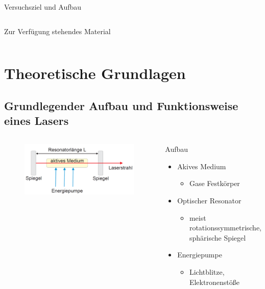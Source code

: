 \documentclass[10pt, aspectratio=169]{beamer}
\begin{document}
\begin{frame}{Versuchsziel und Aufbau}
\begin{columns}
{\begin{block}{Zur Verf\"ugung stehendes Material}
\begin{description}
{          }
        \end{description}
      \end{block}
    }
  \end{columns}
\end{frame}


\section{Theoretische Grundlagen}
\subsection{Grundlegender Aufbau und Funktionsweise eines Lasers}
\label{sec:funkt}
\begin{frame}
  \begin{columns}
    \begin{figure}[H]\centering
      \includegraphics[width=\columnwidth]{schema.png}
    \end{figure}

    \begin{block}{Aufbau}
      \begin{itemize}
      \item Akives Medium
        \begin{itemize}
        \item Gase Festk\"orper
        \end{itemize}
      \item Optischer Resonator
        \begin{itemize}
        \item meist rotationssymmetrische, sph\"arische Spiegel
        \end{itemize}
      \item Energiepumpe
        \begin{itemize}
        \item Lichtblitze, Elektronenst\"oße
        \end{itemize}
      \end{itemize}
    \end{block}
  \end{columns}
\end{frame}
\end{document}
